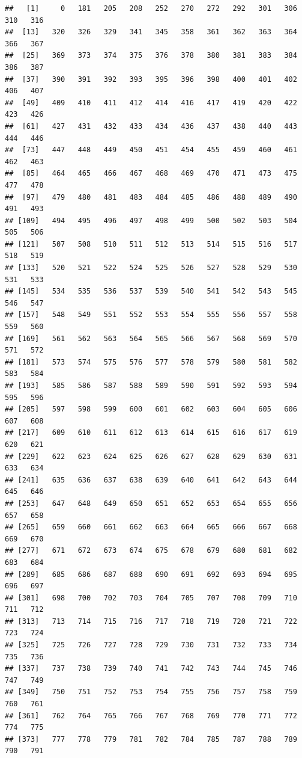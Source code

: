 \documentclass[
]{article}
\begin{document}
\begin{verbatim}
##   [1]     0   181   205   208   252   270   272   292   301   306   310   316
##  [13]   320   326   329   341   345   358   361   362   363   364   366   367
##  [25]   369   373   374   375   376   378   380   381   383   384   386   387
##  [37]   390   391   392   393   395   396   398   400   401   402   406   407
##  [49]   409   410   411   412   414   416   417   419   420   422   423   426
##  [61]   427   431   432   433   434   436   437   438   440   443   444   446
##  [73]   447   448   449   450   451   454   455   459   460   461   462   463
##  [85]   464   465   466   467   468   469   470   471   473   475   477   478
##  [97]   479   480   481   483   484   485   486   488   489   490   491   493
## [109]   494   495   496   497   498   499   500   502   503   504   505   506
## [121]   507   508   510   511   512   513   514   515   516   517   518   519
## [133]   520   521   522   524   525   526   527   528   529   530   531   533
## [145]   534   535   536   537   539   540   541   542   543   545   546   547
## [157]   548   549   551   552   553   554   555   556   557   558   559   560
## [169]   561   562   563   564   565   566   567   568   569   570   571   572
## [181]   573   574   575   576   577   578   579   580   581   582   583   584
## [193]   585   586   587   588   589   590   591   592   593   594   595   596
## [205]   597   598   599   600   601   602   603   604   605   606   607   608
## [217]   609   610   611   612   613   614   615   616   617   619   620   621
## [229]   622   623   624   625   626   627   628   629   630   631   633   634
## [241]   635   636   637   638   639   640   641   642   643   644   645   646
## [253]   647   648   649   650   651   652   653   654   655   656   657   658
## [265]   659   660   661   662   663   664   665   666   667   668   669   670
## [277]   671   672   673   674   675   678   679   680   681   682   683   684
## [289]   685   686   687   688   690   691   692   693   694   695   696   697
## [301]   698   700   702   703   704   705   707   708   709   710   711   712
## [313]   713   714   715   716   717   718   719   720   721   722   723   724
## [325]   725   726   727   728   729   730   731   732   733   734   735   736
## [337]   737   738   739   740   741   742   743   744   745   746   747   749
## [349]   750   751   752   753   754   755   756   757   758   759   760   761
## [361]   762   764   765   766   767   768   769   770   771   772   774   775
## [373]   777   778   779   781   782   784   785   787   788   789   790   791

\end{verbatim}
\end{document}
